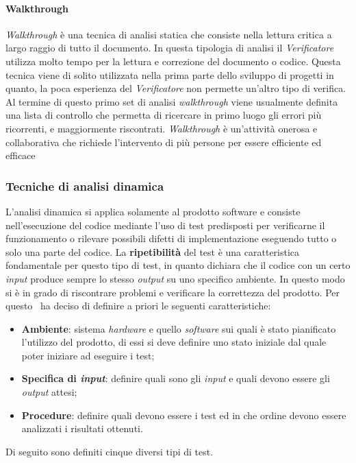 \paragraph{Walkthrough}
\textit{Walkthrough} è una tecnica di analisi statica che consiste nella lettura critica a largo raggio di tutto il documento. In questa tipologia di analisi il \textit{Verificatore} utilizza molto tempo per la lettura e correzione del documento o codice. Questa tecnica viene di solito utilizzata nella prima parte dello sviluppo di progetti in quanto, la poca esperienza del \textit{Verificatore} non permette un'altro tipo di verifica. Al termine di questo primo set di analisi \textit{walkthrough} viene usualmente definita una lista di controllo che permetta di ricercare in primo luogo gli errori più ricorrenti, e maggiormente riscontrati. \textit{Walkthrough} è un'attività onerosa e collaborativa che richiede l'intervento di più persone per essere efficiente ed efficace

\subsubsection{Tecniche di analisi dinamica}
L'analisi dinamica si applica solamente al prodotto software e consiste nell'esecuzione del codice mediante l'uso di test predisposti per verificarne il funzionamento o rilevare possibili difetti di implementazione eseguendo tutto o solo una parte del codice.
La \textbf{ripetibilità} del test è una caratteristica fondamentale per questo tipo di test, in quanto dichiara che il codice con un certo \textit{input} produce sempre lo stesso \textit{output} su uno specifico ambiente. In questo modo si è in grado di riscontrare problemi e verificare la correttezza del prodotto.
Per questo \gruppo ~ha deciso di definire a priori le seguenti caratteristiche:
\begin{itemize}
\item \textbf{Ambiente}: sistema \textit{hardware} e quello \textit{software} sui quali è stato pianificato l'utilizzo del prodotto, di essi si deve definire uno stato iniziale dal quale poter iniziare ad eseguire i test;
\item \textbf{Specifica di \textit{input}}: definire quali sono gli \textit{input} e quali devono essere gli \textit{output} attesi;
\item \textbf{Procedure}: definire quali devono essere i test ed in che ordine devono essere analizzati i risultati ottenuti.
\end{itemize}
Di seguito sono definiti cinque diversi tipi di test.
